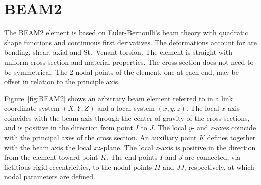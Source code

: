%
%

%
%

\section{BEAM2}
\label{s:BEAM2}

The BEAM2 element is based on Euler-Bernoulli's beam theory with quadratic shape
functions and continuous first derivatives.
The deformations account for are bending, shear, axial and St.\ Venant torsion.
The element is straight with uniform cross section and material properties.
The cross section does not need to be symmetrical.
The 2 nodal points of the element, one at each end, may be offset in relation
to the principle axis.

Figure~\ref{fig:BEAM2} shows an arbitrary beam element referred to in a link
coordinate system $(X, Y, Z)$ and a local system $(x, y, z)$.
The local $x$-axis coincides with the beam axis through the center of gravity of
the cross sections, and is positive in the direction from point $I$ to $J$.
The local $y$- and $z$-axes coincide with the principal axes of the cross section.
An auxiliary point $K$ defines together with the beam axis the local $xz$-plane.
The local $z$-axis is positive in the direction from the element toward point $K$.
The end points $I$ and $J$ are connected, via fictitious rigid eccentricities,
to the nodal points $II$ and $JJ$, respectively, at which nodal parameters are defined.

